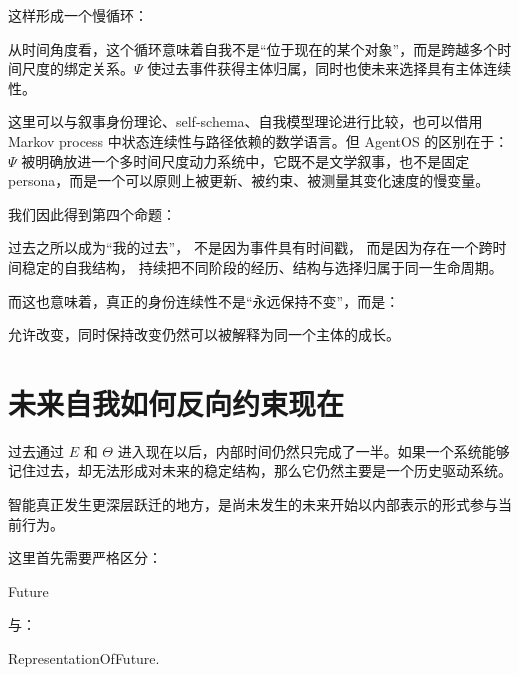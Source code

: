这样形成一个慢循环：

\begin{statementbox}
\centering
{}
\end{statementbox}

从时间角度看，这个循环意味着自我不是“位于现在的某个对象”，而是跨越多个时间尺度的绑定关系。$\Psi$ 使过去事件获得主体归属，同时也使未来选择具有主体连续性。

这里可以与叙事身份理论、self-schema、自我模型理论进行比较，也可以借用 Markov process 中状态连续性与路径依赖的数学语言。但 AgentOS 的区别在于：$\Psi$ 被明确放进一个多时间尺度动力系统中，它既不是文学叙事，也不是固定 persona，而是一个可以原则上被更新、被约束、被测量其变化速度的慢变量。

我们因此得到第四个命题：

\begin{proposition*}
过去之所以成为“我的过去”，
不是因为事件具有时间戳，
而是因为存在一个跨时间稳定的自我结构，
持续把不同阶段的经历、结构与选择归属于同一生命周期。
\end{proposition*}

而这也意味着，真正的身份连续性不是“永远保持不变”，而是：

\begin{statementbox}
允许改变，同时保持改变仍然可以被解释为同一个主体的成长。
\end{statementbox}

\section{未来自我如何反向约束现在}

过去通过 $E$ 和 $\Theta$ 进入现在以后，内部时间仍然只完成了一半。如果一个系统能够记住过去，却无法形成对未来的稳定结构，那么它仍然主要是一个历史驱动系统。

智能真正发生更深层跃迁的地方，是尚未发生的未来开始以内部表示的形式参与当前行为。

这里首先需要严格区分：

\begin{statementbox}
Future
\end{statementbox}

与：

\begin{statementbox}
RepresentationOfFuture.
\end{statementbox}

